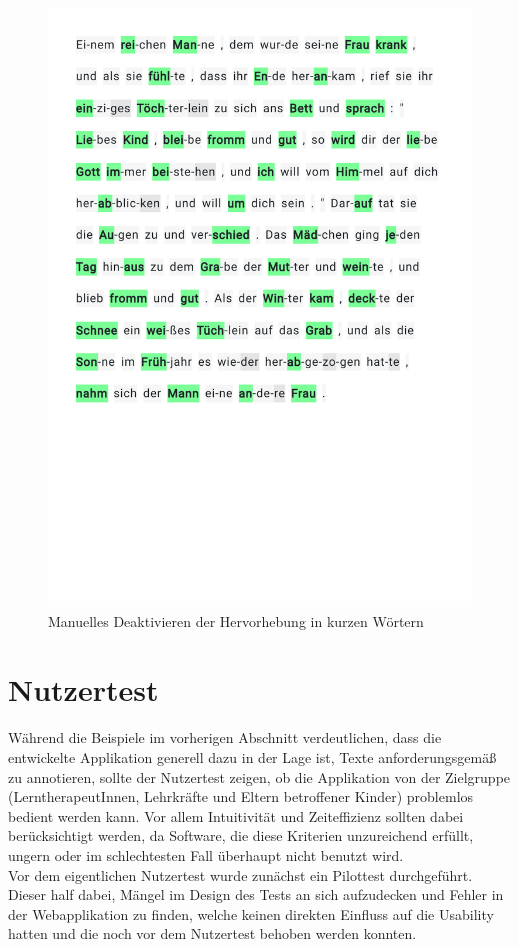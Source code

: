\begin{figure}[h!]
	\centering
	\includegraphics[width=.7\linewidth, frame]{figures/evaluation/annotation5}
	\caption{Manuelles Deaktivieren der Hervorhebung in kurzen Wörtern}
	\label{fig:evaluation-ex5}
\end{figure}
\newpage

\section{Nutzertest}
\label{sec:usertest}

Während die Beispiele im vorherigen Abschnitt verdeutlichen, dass die entwickelte Applikation generell dazu in der Lage ist, Texte anforderungsgemäß zu annotieren, sollte der Nutzertest zeigen, ob die Applikation von der Zielgruppe (LerntherapeutInnen, Lehrkräfte und Eltern betroffener Kinder) problemlos bedient werden kann. Vor allem Intuitivität und Zeiteffizienz sollten dabei berücksichtigt werden, da Software, die diese Kriterien unzureichend erfüllt, ungern oder im schlechtesten Fall überhaupt nicht benutzt wird.\\
Vor dem eigentlichen Nutzertest wurde zunächst ein Pilottest durchgeführt. Dieser half dabei, Mängel im Design des Tests an sich aufzudecken und Fehler in der Webapplikation zu finden, welche keinen direkten Einfluss auf die Usability hatten und die noch vor dem Nutzertest behoben werden konnten.

